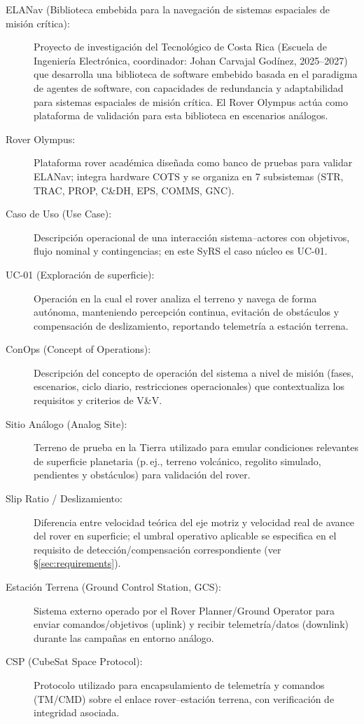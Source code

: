 \begin{description}
    \item[ELANav (Biblioteca embebida para la navegación de sistemas espaciales de misión crítica):] Proyecto de investigación del Tecnológico de Costa Rica (Escuela de Ingeniería Electrónica, coordinador: Johan Carvajal Godínez, 2025--2027) que desarrolla una biblioteca de software embebido basada en el paradigma de agentes de software, con capacidades de redundancia y adaptabilidad para sistemas espaciales de misión crítica. El Rover Olympus actúa como plataforma de validación para esta biblioteca en escenarios análogos.
    \item[Rover Olympus:] Plataforma rover académica diseñada como banco de pruebas para validar ELANav; integra hardware COTS y se organiza en 7 subsistemas (STR, TRAC, PROP, C\&DH, EPS, COMMS, GNC).
    \item[Caso de Uso (Use Case):] Descripción operacional de una interacción sistema--actores con objetivos, flujo nominal y contingencias; en este SyRS el caso núcleo es UC-01. \cite{ieee_29148}
    \item[UC-01 (Exploración de superficie):] Operación en la cual el rover analiza el terreno y navega de forma autónoma, manteniendo percepción continua, evitación de obstáculos y compensación de deslizamiento, reportando telemetría a estación terrena.
    \item[ConOps (Concept of Operations):] Descripción del concepto de operación del sistema a nivel de misión (fases, escenarios, ciclo diario, restricciones operacionales) que contextualiza los requisitos y criterios de V\&V. \cite{nasa_se_handbook}
    \item[Sitio Análogo (Analog Site):] Terreno de prueba en la Tierra utilizado para emular condiciones relevantes de superficie planetaria (p.\,ej., terreno volcánico, regolito simulado, pendientes y obstáculos) para validación del rover.
    \item[Slip Ratio / Deslizamiento:] Diferencia entre velocidad teórica del eje motriz y velocidad real de avance del rover en superficie; el umbral operativo aplicable se especifica en el requisito de detección/compensación correspondiente (ver \S\ref{sec:requirements}).
    \item[Estación Terrena (Ground Control Station, GCS):] Sistema externo operado por el Rover Planner/Ground Operator para enviar comandos/objetivos (uplink) y recibir telemetría/datos (downlink) durante las campañas en entorno análogo.
    \item[CSP (CubeSat Space Protocol):] Protocolo utilizado para encapsulamiento de telemetría y comandos (TM/CMD) sobre el enlace rover--estación terrena, con verificación de integridad asociada. \cite{csp_spec}

\end{description}
